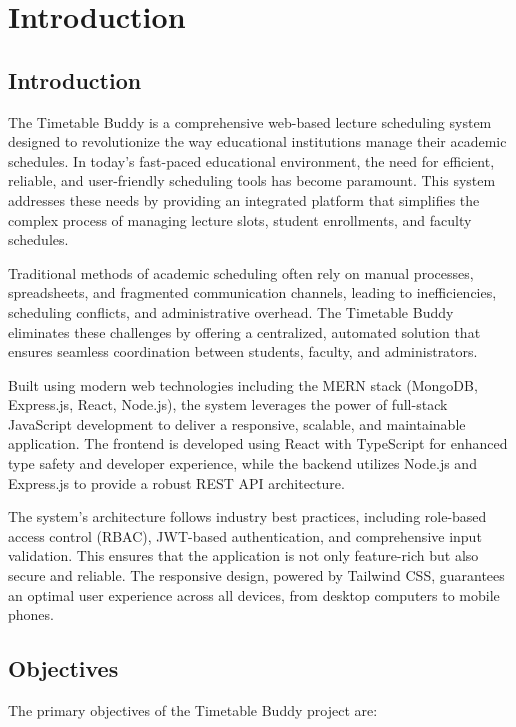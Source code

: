 \chapter{Introduction}

\section{Introduction}
The Timetable Buddy is a comprehensive web-based lecture scheduling system designed to revolutionize the way educational institutions manage their academic schedules. In today's fast-paced educational environment, the need for efficient, reliable, and user-friendly scheduling tools has become paramount. This system addresses these needs by providing an integrated platform that simplifies the complex process of managing lecture slots, student enrollments, and faculty schedules.

Traditional methods of academic scheduling often rely on manual processes, spreadsheets, and fragmented communication channels, leading to inefficiencies, scheduling conflicts, and administrative overhead. The Timetable Buddy eliminates these challenges by offering a centralized, automated solution that ensures seamless coordination between students, faculty, and administrators.

Built using modern web technologies including the MERN stack (MongoDB, Express.js, React, Node.js), the system leverages the power of full-stack JavaScript development to deliver a responsive, scalable, and maintainable application. The frontend is developed using React with TypeScript for enhanced type safety and developer experience, while the backend utilizes Node.js and Express.js to provide a robust REST API architecture.

The system's architecture follows industry best practices, including role-based access control (RBAC), JWT-based authentication, and comprehensive input validation. This ensures that the application is not only feature-rich but also secure and reliable. The responsive design, powered by Tailwind CSS, guarantees an optimal user experience across all devices, from desktop computers to mobile phones.

\section{Objectives}
The primary objectives of the Timetable Buddy project are:

